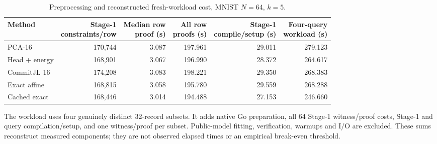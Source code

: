 \begin{table}[!htbp]
\caption{Preprocessing and reconstructed fresh-workload cost, MNIST $N=64$, $k=5$.}\label{tab:preprocessing}
\centering\small
\begin{adjustbox}{max width=\textwidth}
\begin{tabular}{@{}lrrrrr@{}}
\toprule
Method & \shortstack{Stage-1\\constraints/row} & \shortstack{Median row\\proof (s)} & \shortstack{All row\\proofs (s)} & \shortstack{Stage-1\\compile/setup (s)} & \shortstack{Four-query\\workload (s)} \\
\midrule
PCA-16 & 170,744 & 3.087 & 197.961 & 29.011 & 279.123 \\
Head + energy & 168,901 & 3.067 & 196.990 & 28.372 & 264.617 \\
CommitJL-16 & 174,208 & 3.083 & 198.221 & 29.350 & 268.383 \\
Exact affine & 168,815 & 3.058 & 195.780 & 29.559 & 268.288 \\
Cached exact & 168,446 & 3.014 & 194.488 & 27.153 & 246.660 \\
\bottomrule
\end{tabular}
\end{adjustbox}
\par\vspace{3pt}\begin{minipage}{0.98\textwidth}\footnotesize The workload uses four genuinely distinct 32-record subsets. It adds native Go preparation, all 64 Stage-1 witness/proof costs, Stage-1 and query compilation/setup, and one witness/proof per subset. Public-model fitting, verification, warmups and I/O are excluded. These sums reconstruct measured components; they are not observed elapsed times or an empirical break-even threshold.\end{minipage}
\end{table}

